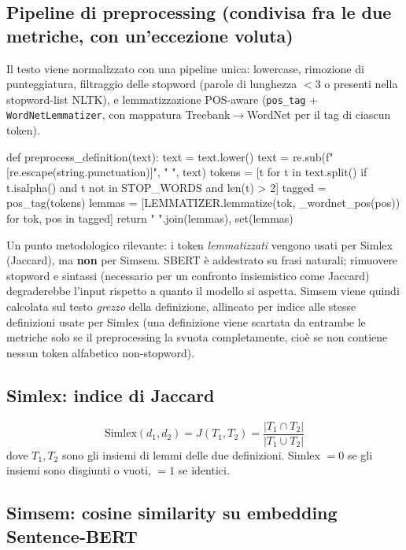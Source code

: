 \documentclass[12pt,a4paper]{article}
\begin{document}
\subsection{Pipeline di preprocessing (condivisa fra le due metriche, con un'eccezione voluta)}

Il testo viene normalizzato con una pipeline unica: lowercase, rimozione di punteggiatura, filtraggio delle stopword (parole di lunghezza $<3$ o presenti nella stopword-list NLTK), e lemmatizzazione POS-aware (\texttt{pos\_tag} + \texttt{WordNetLemmatizer}, con mappatura Treebank$\to$WordNet per il tag di ciascun token).

\begin{pylisting}[title={Pipeline di normalizzazione e lemmatizzazione POS-aware}]
def preprocess_definition(text):
    text = text.lower()
    text = re.sub(f"[{re.escape(string.punctuation)}]", " ", text)
    tokens = [t for t in text.split()
              if t.isalpha() and t not in STOP_WORDS and len(t) > 2]
    tagged = pos_tag(tokens)
    lemmas = [LEMMATIZER.lemmatize(tok, _wordnet_pos(pos))
              for tok, pos in tagged]
    return " ".join(lemmas), set(lemmas)
\end{pylisting}

Un punto metodologico rilevante: i token \emph{lemmatizzati} vengono usati per Simlex (Jaccard), ma \textbf{non} per Simsem. SBERT \`e addestrato su frasi naturali; rimuovere stopword e sintassi (necessario per un confronto insiemistico come Jaccard) degraderebbe l'input rispetto a quanto il modello si aspetta. Simsem viene quindi calcolata sul testo \emph{grezzo} della definizione, allineato per indice alle stesse definizioni usate per Simlex (una definizione viene scartata da entrambe le metriche solo se il preprocessing la svuota completamente, cio\`e se non contiene nessun token alfabetico non-stopword).

\subsection{Simlex: indice di Jaccard}

\[
  \text{Simlex}(d_1, d_2) = J(T_1, T_2) = \frac{|T_1 \cap T_2|}{|T_1 \cup T_2|}
\]
dove $T_1, T_2$ sono gli insiemi di lemmi delle due definizioni. Simlex $=0$ se gli insiemi sono disgiunti o vuoti, $=1$ se identici.

\subsection{Simsem: cosine similarity su embedding Sentence-BERT}
\end{document}

